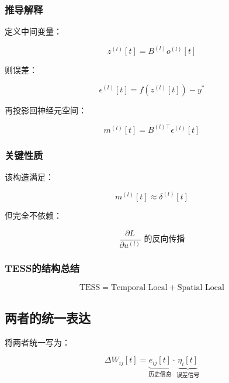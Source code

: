 \documentclass[journal,12pt,onecolumn]{IEEEtran}
\begin{document}
\subsubsection{推导解释}

定义中间变量：

\begin{equation}
z^{(l)}[t] = B^{(l)} o^{(l)}[t]
\end{equation}

则误差：

\begin{equation}
\epsilon^{(l)}[t] = f(z^{(l)}[t]) - y^*
\end{equation}

再投影回神经元空间：

\begin{equation}
m^{(l)}[t] = B^{(l)\top} \epsilon^{(l)}[t]
\end{equation}



\subsubsection{关键性质}

该构造满足：

\begin{equation}
m^{(l)}[t] \approx \delta^{(l)}[t]
\end{equation}

但完全不依赖：

\begin{equation}
\frac{\partial L}{\partial u^{(l)}}
\text{ 的反向传播}
\end{equation}



\subsubsection{TESS的结构总结}

\begin{equation}
\text{TESS} = \text{Temporal Local} + \text{Spatial Local}
\end{equation}



\subsection{两者的统一表达}

将两者统一写为：

\begin{equation}
\Delta W_{ij}[t] = \underbrace{e_{ij}[t]}_{\text{历史信息}} \cdot \underbrace{\eta_i[t]}_{\text{误差信号}}
\end{equation}
\end{document}
